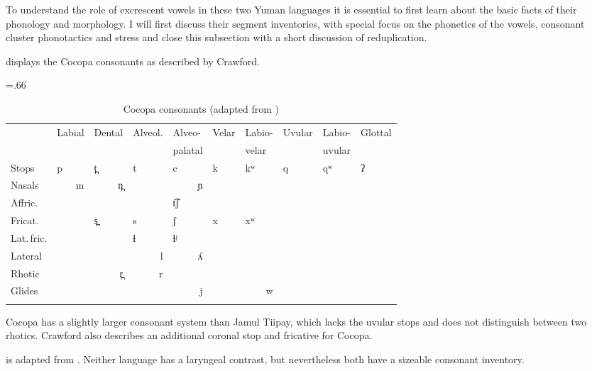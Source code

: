 \documentclass[output=paper,colorlinks,citecolor=brown]{langscibook}
\begin{document}
To understand the role of excrescent vowels in these two Yuman languages it is essential to first learn about the basic facts of their phonology and morphology. I will first discuss their segment inventories, with special focus on the phonetics of the vowels, consonant cluster phonotactics and stress and close this subsection with a short discussion of reduplication.

 displays the Cocopa consonants as described by Crawford.

\begin{table}
\small\tabcolsep=.66\tabcolsep
\caption{Cocopa consonants (adapted from \cite[25]{Crawford1966})}
\label{tab:Kramer:1}
\begin{tabular}{l *9{l}} 
\lsptoprule
& Labial & Dental & Alveol. & Alveo- & Velar & Labio- & Uvular & Labio- & Glottal\\
&        &        &         & palatal &      & velar  &        & uvular & \\ \midrule
Stops & {p} & {t̪} & {t} & {c} & {k} & {kʷ} & {q} & {qʷ} & {ʔ}\\
Nasals & \multicolumn{1}{r}{m} & \multicolumn{1}{r}{n̪} &  & \multicolumn{1}{r}{ɲ} &  &  &  &  & \\
{Affric.} &  &  &  & {t͡ʃ} &  &  &  &  & \\
{Fricat.} &  & {s̪} & {s} & {ʃ} & {x} & {xʷ} &  &  & \\
{Lat.\,fric.} &  &  & {ɬ} & {ɬʲ} &  &  &  &  & \\
{Lateral} &  &  & \multicolumn{1}{r}{l} & \multicolumn{1}{r}{ʎ} &  &  &  &  & \\
{Rhotic} &  & \multicolumn{1}{r}{r̪} & \multicolumn{1}{r}{r} &  &  &  &  &  & \\
{Glides} &  &  &  & \multicolumn{1}{r}{j} &  & \multicolumn{1}{r}{w} &  &  & \\
\lspbottomrule
\end{tabular}
\end{table}

Cocopa has a slightly larger consonant system than Jamul Tiipay, which lacks the uvular stops and does not distinguish between two rhotics. Crawford also describes an additional coronal stop and fricative for Cocopa.

 is adapted from \citet[39ff]{Miller2001}. Neither language has a laryngeal contrast, but nevertheless both have a sizeable consonant inventory.
\end{document}
